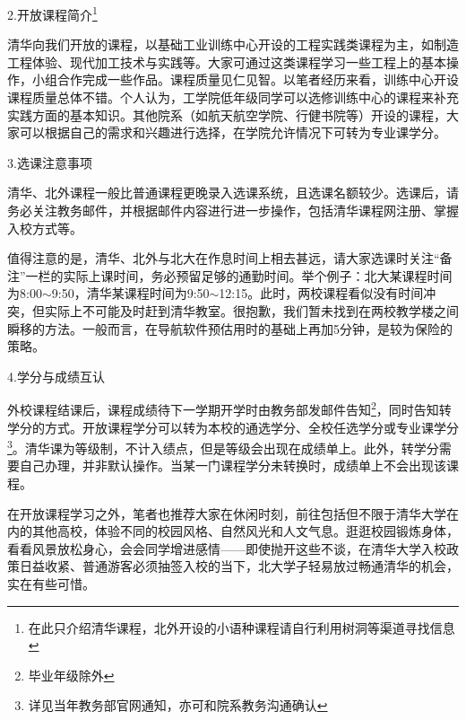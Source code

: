 \documentclass[11pt,oneside]{book}
\begin{document}
\vspace{10pt}

2.开放课程简介\footnote{在此只介绍清华课程，北外开设的小语种课程请自行利用树洞等渠道寻找信息}

\vspace{10pt}

清华向我们开放的课程，以基础工业训练中心开设的工程实践类课程为主，如制造工程体验、现代加工技术与实践等。大家可通过这类课程学习一些工程上的基本操作，小组合作完成一些作品。课程质量见仁见智。以笔者经历来看，训练中心开设课程质量总体不错。个人认为，工学院低年级同学可以选修训练中心的课程来补充实践方面的基本知识。其他院系（如航天航空学院、行健书院等）开设的课程，大家可以根据自己的需求和兴趣进行选择，在学院允许情况下可转为专业课学分。

\vspace{10pt}

3.选课注意事项

\vspace{10pt}

清华、北外课程一般比普通课程更晚录入选课系统，且选课名额较少。选课后，请务必关注教务邮件，并根据邮件内容进行进一步操作，包括清华课程网注册、掌握入校方式等。

\vspace{10pt}

值得注意的是，清华、北外与北大在作息时间上相去甚远，请大家选课时关注“备注”一栏的实际上课时间，务必预留足够的通勤时间。举个例子：北大某课程时间为8:00$\sim$9:50，清华某课程时间为9:50$\sim$12:15。此时，两校课程看似没有时间冲突，但实际上不可能及时赶到清华教室。很抱歉，我们暂未找到在两校教学楼之间瞬移的方法。一般而言，在导航软件预估用时的基础上再加5分钟，是较为保险的策略。

\vspace{10pt}

4.学分与成绩互认

\vspace{10pt}

外校课程结课后，课程成绩待下一学期开学时由教务部发邮件告知\footnote{毕业年级除外}，同时告知转学分的方式。开放课程学分可以转为本校的通选学分、全校任选学分或专业课学分\footnote{详见当年教务部官网通知，亦可和院系教务沟通确认}。清华课为等级制，不计入绩点，但是等级会出现在成绩单上。此外，转学分需要自己办理，并非默认操作。当某一门课程学分未转换时，成绩单上不会出现该课程。

\vspace{10pt}

在开放课程学习之外，笔者也推荐大家在休闲时刻，前往包括但不限于清华大学在内的其他高校，体验不同的校园风格、自然风光和人文气息。逛逛校园锻炼身体，看看风景放松身心，会会同学增进感情——即使抛开这些不谈，在清华大学入校政策日益收紧、普通游客必须抽签入校的当下，北大学子轻易放过畅通清华的机会，实在有些可惜。
\end{document}

